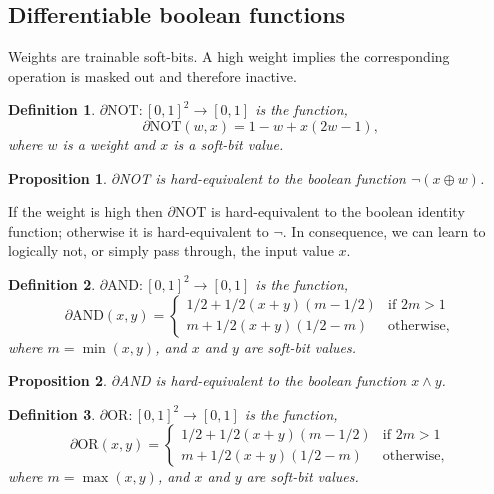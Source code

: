 \documentclass{article} %
\newtheorem*{definition}{Definition}
\newtheorem{prop}{Proposition}
\begin{document}
\subsection{Differentiable boolean functions}

Weights are trainable soft-bits. A high weight implies the corresponding operation is masked out and therefore inactive.

\begin{definition}
$\partial\text{NOT}: [0, 1]^{2} \rightarrow [0,1]$ is the function,
	\begin{equation*}
	\partial\text{NOT}(w, x) = 1 - w + x (2w - 1)\text{,}
	\end{equation*}
where $w$ is a weight and $x$ is a soft-bit value.
\end{definition}

\begin{prop}\label{prop:not}
	$\partial${NOT} is hard-equivalent to the boolean function
$\neg (x \oplus w)$.
\end{prop}

If the weight is high then $\partial${NOT} is hard-equivalent to the boolean identity function; otherwise it is hard-equivalent to $\neg$. In consequence, we can learn to logically not, or simply pass through, the input value $x$.

\begin{definition}
$\partial\text{AND}: [0,1]^{2} \rightarrow [0,1]$ is the function,
	\begin{equation*}
	\partial\text{AND}(x, y) = 
	\begin{cases}
	1/2 + 1/2(x + y)(m - 1/2) & \text{if } 2m > 1 \\
	m + 1/2(x + y)(1/2 - m) & \text{otherwise,}
	\end{cases}
	\end{equation*}
	where $m=\min(x,y)$, and $x$ and $y$ are soft-bit values.
\end{definition}

\begin{prop}\label{prop:and}
	$\partial${AND} is hard-equivalent to the boolean function $x \wedge y$.
\end{prop}

\begin{definition}
$\partial\text{OR}: [0,1]^{2} \rightarrow [0,1]$ is the function,
	\begin{equation*}
	\partial\text{OR}(x, y) = 
	\begin{cases}
	1/2 + 1/2(x + y)(m - 1/2) & \text{if } 2m > 1 \\
	m + 1/2(x + y)(1/2 - m) & \text{otherwise,}
	\end{cases}
	\end{equation*}
	where $m=\max(x,y)$, and $x$ and $y$ are soft-bit values.
\end{definition}
\end{document}

